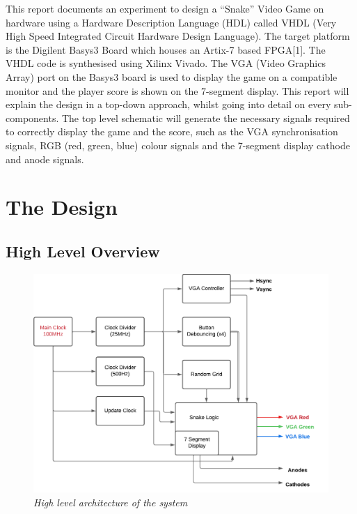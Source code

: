 \documentclass[aps, secnumarabic, balancelastpage, asmath, amssymb, nofootinbib, floatfix,]{revtex4-2}
\begin{document}
{
\setlength{\parindent}{0pt}

This report documents an experiment to design a ``Snake'' Video Game on hardware using a Hardware Description Language (HDL) called VHDL (Very High Speed Integrated Circuit Hardware Design Language). The target platform is the Digilent Basys3 Board which houses an Artix-7 based FPGA[1]. The VHDL code is synthesised using Xilinx Vivado. The VGA (Video Graphics Array) port on the Basys3 board is used to display the game on a compatible monitor and the player score is shown on the 7-segment display. This report will explain the design in a top-down approach, whilst going into detail on every sub-components. The top level schematic will generate the necessary signals required to correctly display the game and the score, such as the VGA synchronisation signals, RGB (red, green, blue) colour signals and the 7-segment display cathode and anode signals.

\section{\fontsize{11.3pt}{12pt}\selectfont \bf The Design}

\subsection{\fontsize{11.4pt}{12pt}\selectfont \bf High Level Overview \label{sec:2.1}}

\fontsize{11pt}{12pt}\selectfont
\label{sec:2}

\begin{figure}[h]
  \centering
  \includegraphics[scale = 0.7]{VGA-Flow - Page 1.pdf}
  \caption{\em High level architecture of the system}
  \label{fig:1}
\end{figure}

}
\end{document}
